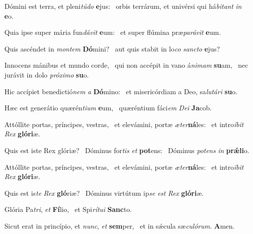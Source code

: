 \item Dómini est terra, et pleni\textit{túdo} \textbf{e}jus:~\psstar{} orbis terrárum, et univérsi qui há\textit{bitant} \textit{in} \textbf{e}o.
\item Quia ipse super mária fun\textit{dávit} \textbf{e}um:~\psstar{} et super flúmina præ\textit{parávit} \textbf{e}um.
\item Quis ascéndet in \textit{montem} \textbf{Dó}mini?~\psstar{} aut quis stabit in lo\textit{co} \textit{sancto} \textbf{e}jus?
\item Innocens mánibus et mundo corde,~\pscross{} qui non accépit in vano á\textit{nimam} \textbf{su}am,~\psstar{} nec jurávit in dolo \textit{próximo} \textbf{su}o.
\item Hic accípiet benedictió\textit{nem} \textit{a} \textbf{Dó}mino:~\psstar{} et misericórdiam a Deo, sa\textit{lutári} \textbf{su}o.
\item Hæc est generátio quærén\textit{tium} \textbf{e}um,~\psstar{} quæréntium fáci\textit{em} \textit{Dei} \textbf{Ja}cob.
\item Attóllite portas, príncipes, vestras,~\pscross{} et elevámini, portæ \textit{æter}\textbf{ná}les:~\psstar{} et intro\textit{íbit} \textit{Rex} \textbf{gló}\textbf{ri}æ.
\item Quis est iste Rex glóriæ?~\pscross{} Dóminus for\textit{tis} \textit{et} \textbf{pot}ens:~\psstar{} Dóminus \textit{potens} \textit{in} \textbf{prǽ}\textbf{li}o.
\item Attóllite portas, príncipes, vestras,~\pscross{} et elevámini, portæ \textit{æter}\textbf{ná}les:~\psstar{} et intro\textit{íbit} \textit{Rex} \textbf{gló}\textbf{ri}æ.
\item Quis est is\textit{te} \textit{Rex} \textbf{gló}riæ?~\psstar{} Dóminus virtútum ip\textit{se} \textit{est} \textit{Rex} \textbf{gló}\textbf{ri}æ.
\item Glória Pa\textit{tri}, \textit{et} \textbf{Fí}lio,~\psstar{} et Spi\textit{rítui} \textbf{Sanc}to.
\item Sicut erat in princípio, et \textit{nunc}, \textit{et} \textbf{sem}per,~\psstar{} et in sǽcula sæ\textit{culórum}. \textbf{A}men.
